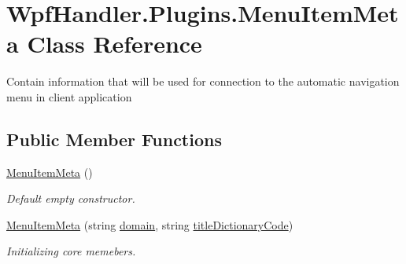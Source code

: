 \hypertarget{class_wpf_handler_1_1_plugins_1_1_menu_item_meta}{}\section{Wpf\+Handler.\+Plugins.\+Menu\+Item\+Meta Class Reference}
\label{class_wpf_handler_1_1_plugins_1_1_menu_item_meta}


Contain information that will be used for connection to the automatic navigation menu in client application  


\subsection*{Public Member Functions}
\begin{DoxyCompactItemize}
\item 
\mbox{\hyperlink{class_wpf_handler_1_1_plugins_1_1_menu_item_meta_aa4fb81675356848e0e44b87cbfb6b76b}{Menu\+Item\+Meta}} ()
\begin{DoxyCompactList}\small\item\em Default empty constructor. \end{DoxyCompactList}\item 
\mbox{\hyperlink{class_wpf_handler_1_1_plugins_1_1_menu_item_meta_a0151fef18aa63b197c0dda26fd3a01eb}{Menu\+Item\+Meta}} (string \mbox{\hyperlink{class_wpf_handler_1_1_plugins_1_1_menu_item_meta_a029f2a5b3bfe5165d6e00ae76afed48e}{domain}}, string \mbox{\hyperlink{class_wpf_handler_1_1_plugins_1_1_menu_item_meta_ad86b56cff5215164499143cf088c2bf8}{title\+Dictionary\+Code}})
\begin{DoxyCompactList}\small\item\em Initializing core memebers. \end{DoxyCompactList}\end{DoxyCompactItemize}
